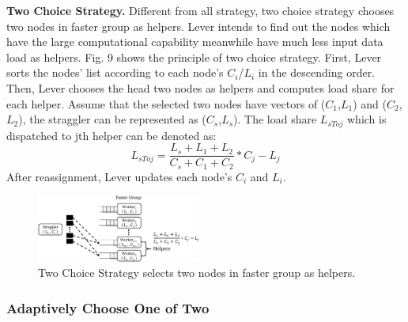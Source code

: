 \documentclass[10pt,conference,compsocconf,letterpaper]{IEEEtran}
\begin{document}
  \textbf{Two Choice Strategy.} Different from all strategy, two choice strategy chooses two nodes in faster group as helpers. Lever intends to find out the nodes which have the large computational capability meanwhile have much less input data load as helpers. Fig. 9 shows the principle of two choice strategy. First, Lever sorts the nodes' list according to each node's \emph{$C_i$}/\emph{$L_i$} in the descending order. Then, Lever chooses the head two nodes as helpers and computes load share for each helper. Assume that the selected two nodes have vectors of (\emph{$C_1$},\emph{$L_1$}) and (\emph{$C_2$},\emph{$L_2$}), the straggler can be represented as (\emph{$C_s$},\emph{$L_s$}). The load share \emph{{$L_{sToj}$}} which is dispatched to jth helper can be denoted as:
  \begin{equation}
  L_{sToj} = \frac{L_s + L_1 + L_2}{C_s + C_1 + C_2}*C_j - L_j
  \end{equation}
  After reassignment, Lever updates each node's $C_i$ and $L_i$.
  \begin{figure}[htbp]
    \centering
    \includegraphics[width=0.48\textwidth]{FigureS2}
    \caption{Two Choice Strategy selects two nodes in faster group as helpers.}
    \label{Fig. 9:}
  \end{figure}

\subsubsection{Adaptively Choose One of Two}
\end{document}
